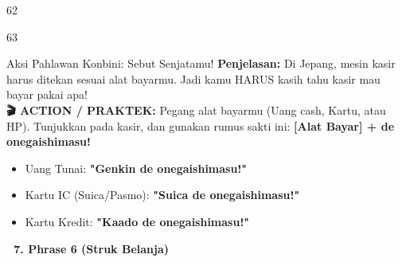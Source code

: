 \begin{convobox}{62}
    \noindent

    \vspace{1.5em}
\end{convobox}

\begin{convobox}{63}
    \noindent

    \vspace{1.5em}
\end{convobox}

\begin{lessonbox}{Aksi Pahlawan Konbini: Sebut Senjatamu!}
    \textbf{Penjelasan:} Di Jepang, mesin kasir harus ditekan sesuai alat bayarmu. Jadi kamu HARUS kasih tahu kasir mau bayar pakai apa!
    \\
    \textbf{🎬 ACTION / PRAKTEK:} 
    Pegang alat bayarmu (Uang cash, Kartu, atau HP). Tunjukkan pada kasir, dan gunakan rumus sakti ini: \textbf{[Alat Bayar] + de onegaishimasu!}
    \begin{itemize}
        \item Uang Tunai: \textbf{"Genkin de onegaishimasu!"}
        \item Kartu IC (Suica/Pasmo): \textbf{"Suica de onegaishimasu!"}
        \item Kartu Kredit: \textbf{"Kaado de onegaishimasu!"}
    \end{itemize}
\end{lessonbox}

\vspace{2em}
\begin{tcolorbox}[colback=boxframe, colframe=boxframe, rounded corners, boxrule=0pt, arc=3mm, left=2mm, top=2mm, bottom=2mm]
    \Large \bfseries \color{white} 🧾 7. Phrase 6 (Struk Belanja)
\end{tcolorbox}
\vspace{1em}

